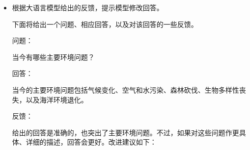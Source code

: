 \begin{itemize}
\begin{tcolorbox}
\uline{给出的回答是准确的，也突出了主要环境问题。不过，如果对这些问题作更具体、详细的描述，回答会更好。改进建议如下：}

\vspace{0.2em}

\hspace{1em} \uline{1. 加入环境问题的具体实例。}

\vspace{0.1em}

\hspace{1em} \uline{2. 补充主要污染物的信息。}

\vspace{0.1em}

\hspace{1em} \uline{3. 指出受影响最严重的地区。}

\endgroup

\end{tcolorbox}
\vspace{0.5em}


\item 根据大语言模型给出的反馈，提示模型修改回答。

\vspace{0.5em}
\begin{tcolorbox}

\begingroup
\setlength{\leftskip}{2em}
\setlength{\rightskip}{2em}

下面将给出一个问题、相应回答，以及对该回答的一些反馈。

\vspace{0.5em}

问题：

\vspace{0.2em}

当今有哪些主要环境问题？

\vspace{0.5em}

回答：

\vspace{0.2em}

当今的主要环境问题包括气候变化、空气和水污染、森林砍伐、生物多样性丧失，以及海洋环境退化。

\vspace{0.5em}

反馈：

\vspace{0.2em}

给出的回答是准确的，也突出了主要环境问题。不过，如果对这些问题作更具体、详细的描述，回答会更好。改进建议如下：


\end{tcolorbox}
\end{itemize}
